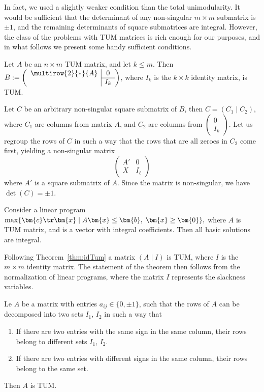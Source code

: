 \noindent
In fact, we used a slightly weaker condition than the total unimodularity. It would be sufficient that
the determinant of any non-singular $m\times m$ submatrix is $\pm1$, and the remaining determinants of 
square submatrices are integral. However, the class of the problems with TUM matrices is rich enough for 
our purposes, and in what follows we present some handy sufficient conditions.

\begin{veta}
  \label{thm:idTum}
  Let $A$ be an $n\times m$ TUM matrix, and let  $k\le m$. Then  
$B:=\left(\begin{array}{c|c}\multirow{2}{*}{{\Large A}}&0\\\cline{2-2} &I_k\end{array}\right)$, where
  $I_k$ is the  $k\times k$ identity matrix, is TUM.
\end{veta}
\begin{dokaz}
  Let $C$ be an arbitrary non-singular square submatrix of $B$, then $C=(C_1\mid C_2)$,
  where $C_1$ are columns from matrix $A$, and $C_2$ are columns from 
$\left(\begin{array}{c}0\\\hline I_k\end{array}\right)$. Let us regroup the rows of $C$ in such a way
  that the rows that are all zeroes in $C_2$ come first, yielding a non-singular matrix
$$\left(\begin{array}{c|c}A'&0\\\hline X&I_\ell\end{array}\right)$$
  where $A'$ is a square submatrix of $A$. Since the matrix is non-singular, we have
  $\det(C)=\pm1$.
\end{dokaz}

\begin{veta}
  Consider a linear program 
  $\max\{\bm{c}\tr\bm{x}\mid A\bm{x}\le\bm{b},\;\bm{x}\ge\bm{0}\},$
  where $A$ is TUM matrix, and  is a vector with integral coefficients. Then all basic solutions are
  integral.
\end{veta}
\begin{dokaz}
  Following Theorem~\ref{thm:idTum} a matrix $(A\mid I)$ is TUM, where $I$ is the $m\times m$ identity matrix.
  The statement of the theorem then follows from the normalization of linear programs, where the matrix
  $I$ represents the slackness variables.
\end{dokaz}

\begin{veta}
  \label{thm:unimod}
  Le $A$ be a matrix with entries $a_{ij}\in\{0,\pm1\}$, such that the rows of $A$ can be decomposed into 
  two sets $I_1$, $I_2$ in such a way that
  \begin{enumerate}
    \item If there are two entries with the same sign in the same column, their rows belong to different 
      sets $I_1$, $I_2$.
    \item If there are two entries with different signs in the same column, their rows belong to the same set.
  \end{enumerate}
  Then $A$ is TUM.
\end{veta}

